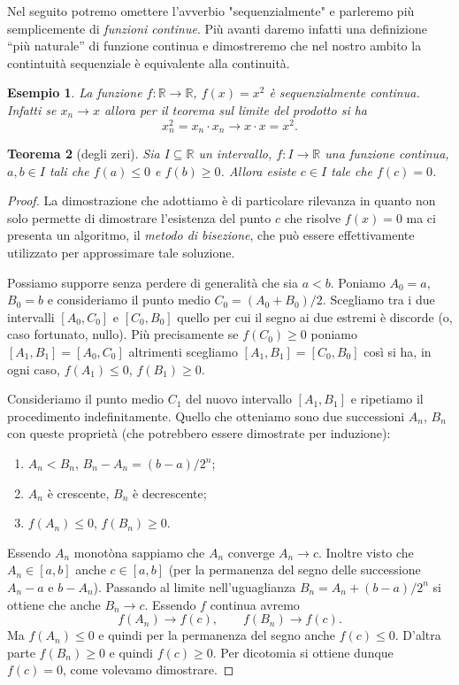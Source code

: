 \documentclass[italian,a4paper,oneside,headinclude]{scrbook}
\newcommand{\myemph}[1]{\emph{#1}\marginpar{#1}\index{#1}}
\renewcommand{\subset}{\subseteq}
\newcommand{\RR}{\mathbb R}
\newtheorem{theorem}{Teorema}
\newtheorem{example}[theorem]{Esempio}
\begin{document}
Nel seguito potremo omettere l'avverbio "sequenzialmente" e parleremo
più semplicemente di \emph{funzioni continue}. Più avanti daremo
infatti una definizione ``più naturale'' di funzione continua
e dimostreremo che nel nostro ambito
la contintuità sequenziale è equivalente alla continuità.

\begin{example}
La funzione $f\colon \RR \to \RR$, $f(x) = x^2$ è sequenzialmente continua.
Infatti se $x_n\to x$ allora per il teorema sul limite del prodotto si ha
\[
  x_n^2 = x_n \cdot x_n \to x\cdot x = x^2.
\]
\end{example}

\begin{theorem}[degli zeri]
Sia $I\subset \RR$ un intervallo, $f\colon I \to \RR$ una funzione
continua, $a,b\in I$ tali che $f(a)\le 0$ e $f(b)\ge 0$.
Allora esiste $c\in I$ tale che $f(c)=0$.
\end{theorem}

\begin{proof}
La dimostrazione che adottiamo è di particolare rilevanza in quanto
non solo permette di dimostrare l'esistenza del punto $c$ che risolve
$f(x)=0$
ma ci presenta
un algoritmo, il \myemph{metodo di bisezione},
che può essere effettivamente utilizzato per approssimare
tale soluzione.

Possiamo supporre senza perdere di  generalità che sia $a<b$.
Poniamo $A_0 = a$, $B_0= b$ e consideriamo il punto medio $C_0 = (A_0+B_0)/2$.
Scegliamo tra i due intervalli $[A_0, C_0]$ e $[C_0,B_0]$ quello per cui
il segno ai due estremi è discorde (o, caso fortunato, nullo).
Più precisamente se $f(C_0)\ge 0$ poniamo $[A_1,B_1] = [A_0,C_0]$ altrimenti
scegliamo $[A_1,B_1] = [C_0,B_0]$ così si ha, in ogni caso,
$f(A_1)\le 0$, $f(B_1)\ge 0$.

Consideriamo il punto medio $C_1$ del nuovo intervallo $[A_1,B_1]$ e ripetiamo
il procedimento indefinitamente. Quello che otteniamo sono due successioni
$A_n$, $B_n$ con queste proprietà (che potrebbero essere dimostrate per induzione):
\begin{enumerate}
\item $A_n < B_n$, $B_n - A_n = (b-a)/2^n$;
\item $A_n$ è crescente, $B_n$ è decrescente;
\item $f(A_n)\le 0$, $f(B_n)\ge 0$.
\end{enumerate}

Essendo $A_n$ monotòna sappiamo che $A_n$ converge $A_n\to c$.
Inoltre visto che $A_n \in [a,b]$ anche $c\in [a,b]$ (per la permanenza del
segno delle successione $A_n-a$ e $b-A_n$).
Passando al limite nell'uguaglianza $B_n = A_n + (b-a)/2^n$
si ottiene che anche $B_n \to c$. Essendo $f$ continua
avremo
\[
f(A_n) \to f(c), \qquad
f(B_n) \to f(c).
\]
Ma $f(A_n)\le 0$ e quindi per la permanenza del segno anche $f(c)\le 0$.
D'altra parte $f(B_n) \ge 0$ e quindi $f(c)\ge 0$. Per dicotomia si
ottiene dunque $f(c) = 0$, come volevamo dimostrare.
\end{proof}
\end{document}
